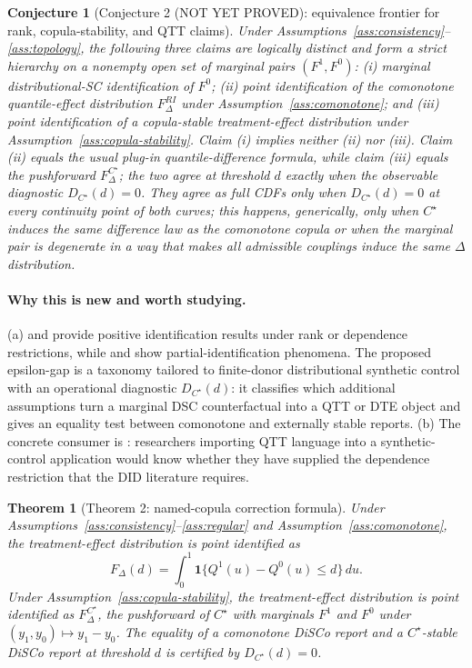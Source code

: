 \documentclass[11pt]{article}
\newcommand{\one}{\mathbf{1}}
\theoremstyle{definition}
\theoremstyle{plain}
\newtheorem{theorem}{Theorem}
\newtheorem{conjecture}{Conjecture}
\theoremstyle{remark}
\begin{document}
\begin{conjecture}[Conjecture 2 (NOT YET PROVED): equivalence frontier for rank, copula-stability, and QTT claims]\label{conj:taxonomy}
Under Assumptions~\ref{ass:consistency}--\ref{ass:topology}, the following three claims are logically distinct and form a strict hierarchy on a nonempty open set of marginal pairs \((F^1,F^0)\): (i) marginal distributional-SC identification of \(F^0\); (ii) point identification of the comonotone quantile-effect distribution \(F^{RI}_\Delta\) under Assumption~\ref{ass:comonotone}; and (iii) point identification of a copula-stable treatment-effect distribution under Assumption~\ref{ass:copula-stability}.  Claim (i) implies neither (ii) nor (iii).  Claim (ii) equals the usual plug-in quantile-difference formula, while claim (iii) equals the pushforward \(F^{C^\star}_\Delta\); the two agree at threshold \(d\) exactly when the observable diagnostic \(D_{C^\star}(d)=0\).  They agree as full CDFs only when \(D_{C^\star}(d)=0\) at every continuity point of both curves; this happens, generically, only when \(C^\star\) induces the same difference law as the comonotone copula or when the marginal pair is degenerate in a way that makes all admissible couplings induce the same \(\Delta\) distribution.
\end{conjecture}
\paragraph{Why this is new and worth studying.}
(a) \cite{AtheyImbens2006CIC} and \cite{CallawayLi2019QTEDID} provide positive identification results under rank or dependence restrictions, while \cite{FanYu2012PartialDID} and \cite{Callaway2021BoundsDTEPanel} show partial-identification phenomena.  The proposed epsilon-gap is a taxonomy tailored to finite-donor distributional synthetic control with an operational diagnostic \(D_{C^\star}(d)\): it classifies which additional assumptions turn a marginal DSC counterfactual into a QTT or DTE object and gives an equality test between comonotone and externally stable reports.  (b) The concrete consumer is \cite{CallawayLi2019QTEDID}: researchers importing QTT language into a synthetic-control application would know whether they have supplied the dependence restriction that the DID literature requires.

\begin{theorem}[Theorem 2: named-copula correction formula]\label{thm:comonotone}
Under Assumptions~\ref{ass:consistency}--\ref{ass:regular} and Assumption~\ref{ass:comonotone}, the treatment-effect distribution is point identified as
\[
F_\Delta(d)=\int_0^1\one\{Q^1(u)-Q^0(u)\le d\}\,du.
\]
Under Assumption~\ref{ass:copula-stability}, the treatment-effect distribution is point identified as \(F^{C^\star}_\Delta\), the pushforward of \(C^\star\) with marginals \(F^1\) and \(F^0\) under \((y_1,y_0)\mapsto y_1-y_0\).  The equality of a comonotone DiSCo report and a \(C^\star\)-stable DiSCo report at threshold \(d\) is certified by \(D_{C^\star}(d)=0\).
\end{theorem}
\end{document}
